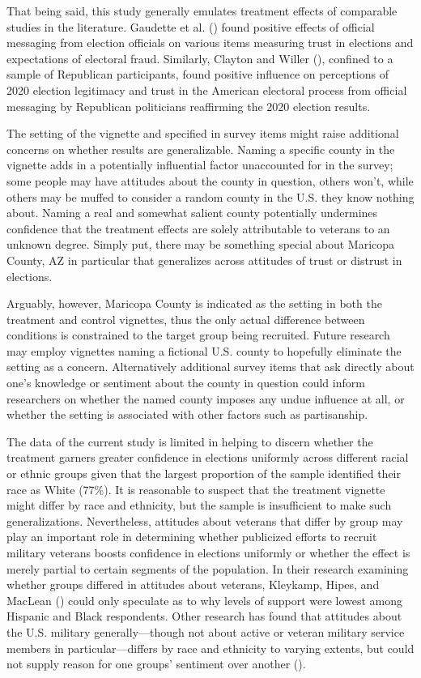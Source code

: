\documentclass[
  12pt,
  letterpaper,
]{article}
\begin{document}
That being said, this study generally emulates treatment effects of
comparable studies in the literature. Gaudette et al.
() found positive effects of official
messaging from election officials on various items measuring trust in
elections and expectations of electoral fraud. Similarly, Clayton and
Willer (), confined to a sample of
Republican participants, found positive influence on perceptions of 2020
election legitimacy and trust in the American electoral process from
official messaging by Republican politicians reaffirming the 2020
election results.

The setting of the vignette and specified in survey items might raise
additional concerns on whether results are generalizable. Naming a
specific county in the vignette adds in a potentially influential factor
unaccounted for in the survey; some people may have attitudes about the
county in question, others won't, while others may be muffed to consider
a random county in the U.S. they know nothing about. Naming a real and
somewhat salient county potentially undermines confidence that the
treatment effects are solely attributable to veterans to an unknown
degree. Simply put, there may be something special about Maricopa
County, AZ in particular that generalizes across attitudes of trust or
distrust in elections.

Arguably, however, Maricopa County is indicated as the setting in both
the treatment and control vignettes, thus the only actual difference
between conditions is constrained to the target group being recruited.
Future research may employ vignettes naming a fictional U.S. county to
hopefully eliminate the setting as a concern. Alternatively additional
survey items that ask directly about one's knowledge or sentiment about
the county in question could inform researchers on whether the named
county imposes any undue influence at all, or whether the setting is
associated with other factors such as partisanship.

The data of the current study is limited in helping to discern whether
the treatment garners greater confidence in elections uniformly across
different racial or ethnic groups given that the largest proportion of
the sample identified their race as White (77\%). It is reasonable to
suspect that the treatment vignette might differ by race and ethnicity,
but the sample is insufficient to make such generalizations.
Nevertheless, attitudes about veterans that differ by group may play an
important role in determining whether publicized efforts to recruit
military veterans boosts confidence in elections uniformly or whether
the effect is merely partial to certain segments of the population. In
their research examining whether groups differed in attitudes about
veterans, Kleykamp, Hipes, and MacLean
() could only speculate as to why
levels of support were lowest among Hispanic and Black respondents.
Other research has found that attitudes about the U.S. military
generally---though not about active or veteran military service members
in particular---differs by race and ethnicity to varying extents, but
could not supply reason for one groups' sentiment over another
().
\end{document}
